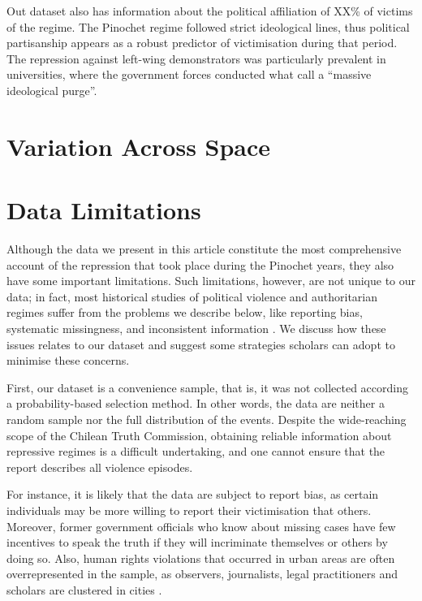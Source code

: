 \documentclass[a4paper,12pt]{article}
\begin{document}

Out dataset also has information about the political affiliation of XX\% of victims of the regime. The Pinochet regime followed strict ideological lines, thus political partisanship appears as a robust predictor of victimisation during that period. The repression against left-wing demonstrators was particularly prevalent in universities, where the government forces conducted what \citet[249]{constable1993nation} call a ``massive ideological purge''. 




\newpage

\section{Variation Across Space}
\label{sec:space}

\section{Data Limitations}
\label{sec:limitations}

Although the data we present in this article constitute the most comprehensive account of the repression that took place during the Pinochet years, they also have some important limitations. Such limitations, however, are not unique to our data; in fact, most historical studies of political violence and authoritarian regimes suffer from the problems we describe below, like reporting bias, systematic missingness, and inconsistent information  \citep[e.g.,][]{art2012we,ball1999guatemala,kalyvas2006logic,king2009data,lustick1996history}. We discuss how these issues relates to our dataset and suggest some strategies scholars can adopt to minimise these concerns.

First, our dataset is a convenience sample, that is, it was not collected according a  probability-based selection method. In other words, the data are neither a random sample nor the full distribution of the events. Despite the wide-reaching scope of the Chilean Truth Commission, obtaining reliable information about repressive regimes is a difficult undertaking, and one cannot ensure that the report describes all violence episodes.

For instance, it is likely that the data are subject to report bias, as certain individuals may be more willing to report their victimisation that others. Moreover, former government officials who know about missing cases have few incentives to speak the truth if they will incriminate themselves or others by doing so. Also, human rights violations that occurred in urban areas are often overrepresented in the sample, as observers, journalists, legal practitioners and scholars are clustered in cities \citep{kalyvas2004urban}.
\end{document}

